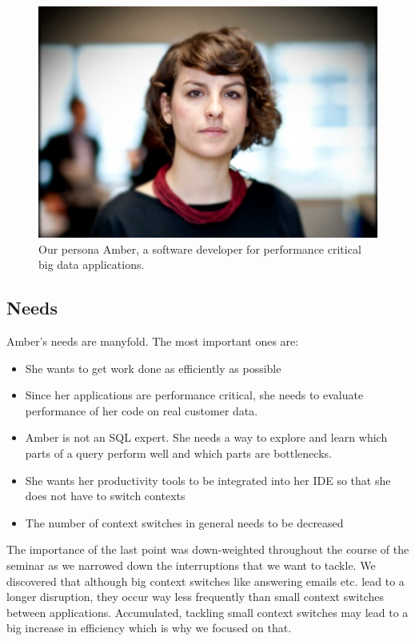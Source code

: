 \begin{figure}
    \includegraphics[width=\linewidth]{images/amber}
    \caption{Our persona Amber, a software developer for performance critical big data applications.}
    \label{fig:amber}
\end{figure}

\subsection{Needs}
Amber's needs are manyfold. The most important ones are:

\begin{itemize}
	\item She wants to get work done as efficiently as possible
	\item Since her applications are performance critical, she needs to evaluate performance of her code on real customer data.
	\item Amber is not an SQL expert. She needs a way to explore and learn which parts of a query perform well and which parts are bottlenecks.
	\item She wants her productivity tools to be integrated into her IDE so that she does not have to switch contexts
	\item The number of context switches in general needs to be decreased
\end{itemize}

The importance of the last point was down-weighted throughout the course of the seminar as we narrowed down the interruptions that we want to tackle. We discovered that although big context switches like answering emails etc. lead to a longer disruption, they occur way less frequently than small context switches between applications. Accumulated, tackling small context switches may lead to a big increase in efficiency which is why we focused on that.  

